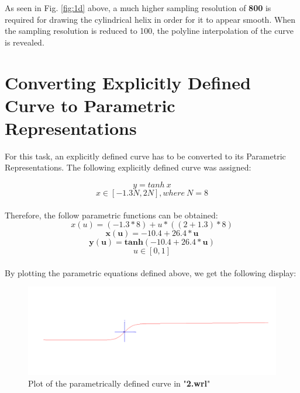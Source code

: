 \documentclass[acmlarge,nonacm=true]{acmart}
\begin{document}
As seen in Fig. \ref{fig:1d} above, a much higher sampling resolution of \textbf{800} is required for drawing the cylindrical helix in order for
it to appear smooth. When the sampling resolution is reduced to 100, the polyline interpolation of the curve is revealed.

\pagebreak
\section{Converting Explicitly Defined Curve to Parametric Representations}
For this task, an explicitly defined curve has to be converted to its Parametric Representations. The following explicitly defined 
curve was assigned:

\begin{displaymath}
	y = tanh \ x
\end{displaymath}
\begin{displaymath}
	x \in [-1.3N, 2N], where \  N = 8
\end{displaymath}
\\Therefore, the follow parametric functions can be obtained:
\begin{displaymath}
	x(u) = (-1.3 * 8) + u * ((2+1.3) * 8)
\end{displaymath}
\begin{displaymath}
	\mathbf{x(u) = -10.4 + 26.4*u}
\end{displaymath}
\begin{displaymath}
	\mathbf{y(u) = tanh(-10.4 + 26.4*u)}
\end{displaymath}
\begin{displaymath}
	u \in [0,1]
\end{displaymath}
\\
By plotting the parametric equations defined above, we get the following display:
\begin{figure}[H]
	\centering
	\includegraphics[width=.9\linewidth]{fig/2}
	\caption{Plot of the parametrically defined curve in "\textbf{2.wrl}"}
	\label{fig:2}
\end{figure}

\pagebreak
\end{document}
